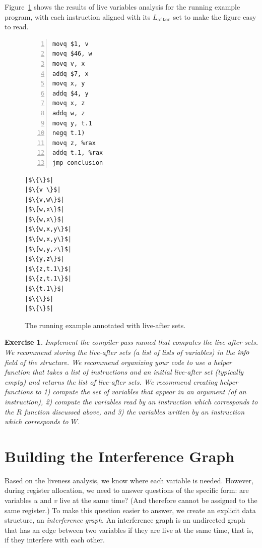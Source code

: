 \documentclass[11pt]{book}
\newtheorem{exercise}[theorem]{Exercise}
\begin{document}
Figure~\ref{fig:live-eg} shows the results of live variables analysis
for the running example program, with each instruction aligned with
its $L_{\mathtt{after}}$ set to make the figure easy to read.

\begin{figure}[tbp]
\hspace{20pt}
\begin{minipage}{0.45\textwidth}
\begin{lstlisting}[numbers=left]
movq $1, v
movq $46, w
movq v, x
addq $7, x
movq x, y
addq $4, y
movq x, z
addq w, z
movq y, t.1
negq t.1)
movq z, %rax
addq t.1, %rax
jmp conclusion
\end{lstlisting}
\end{minipage}
\vrule\hspace{10pt}
\begin{minipage}{0.45\textwidth}
\begin{lstlisting}
|$\{\}$|
|$\{v \}$|
|$\{v,w\}$|
|$\{w,x\}$|
|$\{w,x\}$|
|$\{w,x,y\}$|
|$\{w,x,y\}$|
|$\{w,y,z\}$|
|$\{y,z\}$|
|$\{z,t.1\}$|
|$\{z,t.1\}$|
|$\{t.1\}$|
|$\{\}$|
|$\{\}$|
\end{lstlisting}
\end{minipage}

\caption{The running example annotated with live-after sets.}
\label{fig:live-eg}
\end{figure}

\begin{exercise}\normalfont
Implement the compiler pass named  that computes
the live-after sets. We recommend storing the live-after sets (a list
of lists of variables) in the $\mathit{info}$ field of the 
structure.
%
We recommend organizing your code to use a helper function that takes
a list of instructions and an initial live-after set (typically empty)
and returns the list of live-after sets.
%
We recommend creating helper functions to 1) compute the set of
variables that appear in an argument (of an instruction), 2) compute
the variables read by an instruction which corresponds to the $R$
function discussed above, and 3) the variables written by an
instruction which corresponds to $W$.
\end{exercise}


\section{Building the Interference Graph}
\label{sec:build-interference}

Based on the liveness analysis, we know where each variable is needed.
However, during register allocation, we need to answer questions of
the specific form: are variables $u$ and $v$ live at the same time?
(And therefore cannot be assigned to the same register.)  To make this
question easier to answer, we create an explicit data structure, an
\emph{interference graph}.  An interference graph is an undirected
graph that has an edge between two variables if they are live at the
same time, that is, if they interfere with each other.
\end{document}

